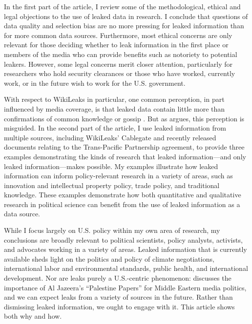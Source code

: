 \documentclass[12pt]{article}
\begin{document}
In the first part of the article, I review some of the methodological, ethical and legal objections to the use of leaked data 
in research. I conclude that 
questions of data quality and selection bias are no more pressing for leaked information 
than for more common data sources. Furthermore, most ethical concerns are only relevant for those deciding 
whether to leak information in the first place or members of the media who can provide benefits 
such as notoriety to potential leakers. However, some legal concerns merit closer attention, particularly for researchers 
who hold security clearances or those who have worked, currently work, or in the future wish to work for the U.S. government.

With respect to WikiLeaks in particular, one common perception, in part influenced by media 
coverage, is that leaked data contain little more than confirmations of common knowledge or 
gossip \citep{saunders2011wikileaks,chesterman2011wikileaks}. But as \citet{bob2010wikileaks} argues, this perception is 
misguided. In the second part of the article, I use leaked information from multiple sources, including WikiLeaks' 
Cablegate and recently 
released documents relating to the Trans-Pacific Partnership agreement, to provide three examples 
demonstrating the kinds of research that leaked information---and only leaked information---makes possible. 
My examples illustrate how leaked information can inform policy-relevant research in a variety of areas, such as 
innovation and intellectual property policy, trade policy, and traditional knowledge.
These examples demonstrate 
how both quantitative and qualitative research in political science can benefit from the use of 
leaked information as a data source. 

While I focus largely on U.S. policy within my own area of research, my conclusions are broadly relevant 
to political scientists, policy analysts, activists, and advocates working in a variety of areas. 
Leaked information that is currently available sheds light on the politics and policy of climate negotiations, 
international labor and environmental standards, public health, and international development. Nor are leaks 
purely a U.S.-centric phenomenon: \citet{zayani2013jazeeras} discusses the importance of Al Jazeera's 
``Palestine Papers'' for Middle Eastern media politics, and we can expect leaks from a variety of sources in the future. 
Rather than dismissing leaked information, we ought to engage with it. This article shows both why and how.
\end{document}
